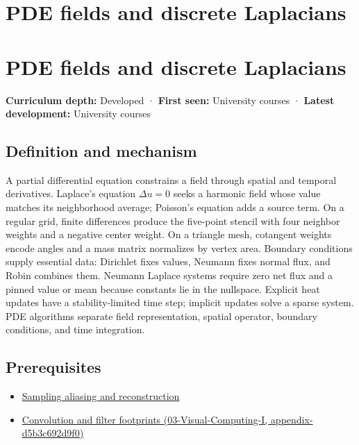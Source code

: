 \hypertarget{appendix-1988d465c119}{}
\section*{PDE fields and discrete Laplacians}
\section{PDE fields and discrete Laplacians}\label{appendix-1988d465c119-pde-fields-and-discrete-laplacians}

\textbf{Curriculum depth:} Developed · \textbf{First seen:} University courses · \textbf{Latest development:} University courses

\subsection{Definition and mechanism}\label{appendix-1988d465c119-definition-and-mechanism}

A partial differential equation constrains a field through spatial and temporal derivatives. Laplace's equation \(\Delta u=0\) seeks a harmonic field whose value matches its neighborhood average; Poisson's equation adds a source term. On a regular grid, finite differences produce the five-point stencil with four neighbor weights and a negative center weight. On a triangle mesh, cotangent weights encode angles and a mass matrix normalizes by vertex area. Boundary conditions supply essential data: Dirichlet fixes values, Neumann fixes normal flux, and Robin combines them. Neumann Laplace systems require zero net flux and a pinned value or mean because constants lie in the nullspace. Explicit heat updates have a stability-limited time step; implicit updates solve a sparse system. PDE algorithms separate field representation, spatial operator, boundary conditions, and time integration.

\subsection{Prerequisites}\label{appendix-1988d465c119-prerequisites}

\begin{itemize}
\tightlist
\item
  \hyperref[appendix-6a7869dd79a6]{Sampling aliasing and reconstruction}
\item
  \href{../03-Visual-Computing-I/main.pdf\#nameddest=appendix-d5b3c692d9f0}{Convolution and filter footprints (03-Visual-Computing-I, appendix-d5b3c692d9f0)}
\end{itemize}

